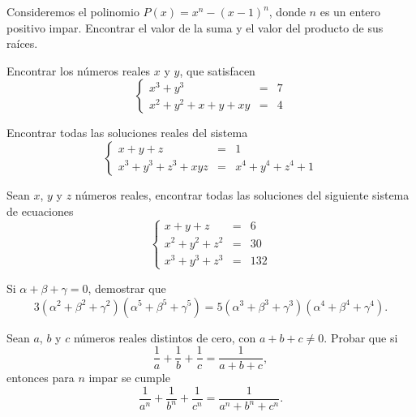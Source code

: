 \showLine
\begin{multicols}{2}
    \begin{problem}
        Consideremos el polinomio $P(x) = x^n - (x - 1)^n$, donde $n$ es un entero positivo impar.
        Encontrar el valor de la suma y el valor del producto de sus raíces.
    \end{problem}

    \begin{problem}
        Encontrar los números reales $x$ y $y$, que satisfacen
        \[
            \left\{
            \begin{array}{rcl}
                x^3 + y^3 & =& 7\\
                x^2 + y^2 + x + y + xy & =& 4
            \end{array}
            \right.
        \]
    \end{problem}

    \begin{problem}
        Encontrar todas las soluciones reales del sistema
        \[
            \left\{
            \begin{array}{rcl}
                x + y + z & =& 1\\
                x^3 + y^3 + z^3 + xyz & =& x^4 + y^4 + z^4 + 1
            \end{array}
            \right.
        \]
    \end{problem}

    \begin{problem}
        Sean $x$, $y$ y $z$ números reales, encontrar todas las soluciones del siguiente sistema de ecuaciones
        \[
            \left\{
            \begin{array}{rcl}
                x + y + z & =& 6\\
                x^2 + y^2 + z^2 & =& 30\\
                x^3 + y^3 + z^3 & =& 132
            \end{array}
            \right.
        \]
    \end{problem}

    \begin{problem}
        Si $\alpha + \beta + \gamma = 0$, demostrar que
        \[3 (\alpha^2 + \beta^2 + \gamma^2) (\alpha^5 + \beta^5 + \gamma^5) = 5 (\alpha^3 + \beta^3 + \gamma^3) (\alpha^4 + \beta^4 + \gamma^4).\]
    \end{problem}

    \begin{problem}
        Sean $a$, $b$ y $c$ números reales distintos de cero, con $a + b + c \neq 0$.
        Probar que si
        \[\frac{1}{a} + \frac{1}{b} + \frac{1}{c} = \frac{1}{a + b + c},\]
        entonces para $n$ impar se cumple
        \[\frac{1}{a^n} + \frac{1}{b^n} + \frac{1}{c^n} = \frac{1}{a^n + b^n + c^n}.\]
    \end{problem}
\end{multicols}
